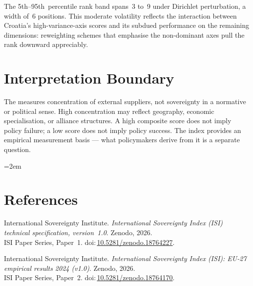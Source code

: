 \documentclass[12pt,a4paper]{article}
\begin{document}
The 5th--95th~percentile rank band spans~3 to~9 under Dirichlet perturbation, a width of~6 positions.  This moderate volatility reflects the interaction between Croatia's high-variance-axis scores and its subdued performance on the remaining dimensions: reweighting schemes that emphasise the non-dominant axes pull the rank downward appreciably.


\section{Interpretation Boundary}
\label{sec:interpretation}

The \ISI measures concentration of external suppliers, not sovereignty in a normative or political sense.  High concentration may reflect geography, economic specialisation, or alliance structures.  A high composite score does not imply policy failure; a low score does not imply policy success.  The index provides an empirical measurement basis --- what policymakers derive from it is a separate question.


\clearpage
\vspace*{1.5cm}

\begingroup\emergencystretch=2em
\section*{References}

\begin{enumerate}[label={[\arabic*]},leftmargin=2em,itemsep=6pt]
\item International Sovereignty Institute.
  \textit{International Sovereignty Index (ISI) technical specification, version~1.0}.
  Zenodo, 2026.\\ISI Paper Series, Paper~1.
  doi:\,\href{https://doi.org/10.5281/zenodo.18764227}{10.5281/zenodo.18764227}.

\item International Sovereignty Institute.
  \textit{International Sovereignty Index (ISI): EU-27 empirical results 2024 (v1.0)}.
  Zenodo, 2026.\\ISI Paper Series, Paper~2.
  doi:\,\href{https://doi.org/10.5281/zenodo.18764170}{10.5281/zenodo.18764170}.
\end{enumerate}
\endgroup
\end{document}
